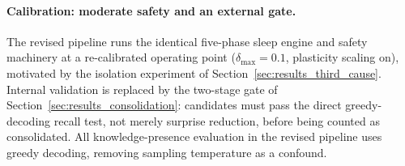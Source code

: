 \paragraph{Calibration: moderate safety and an external gate.} The revised pipeline runs the identical five-phase sleep engine and safety machinery at a re-calibrated operating point ($\delta_{\max}=0.1$, plasticity scaling on), motivated by the isolation experiment of Section~\ref{sec:results_third_cause}. Internal validation is replaced by the two-stage gate of Section~\ref{sec:results_consolidation}: candidates must pass the direct greedy-decoding recall test, not merely surprise reduction, before being counted as consolidated. All knowledge-presence evaluation in the revised pipeline uses greedy decoding, removing sampling temperature as a confound.
